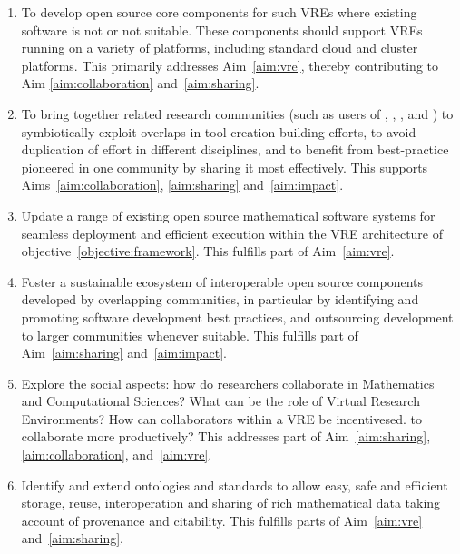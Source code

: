 \documentclass[noworkareas,deliverables,\classoptions]{euproposal}       %
\begin{document}
\begin{proposal}
\begin{enumerate}
\item\label{objectives:core} To develop open source core components
  for such VREs where existing software is not  or not suitable. These
  components should support VREs running on a variety of
  platforms, including standard cloud and cluster platforms. This primarily
  addresses Aim~\ref{aim:vre}, thereby contributing to Aim
  \ref{aim:collaboration} and~\ref{aim:sharing}.

\item \label{objective:community} To bring together related research
  communities (such as users of \Jupyter, \Sage, \Singular, and \GAP)
  to symbiotically exploit overlaps in tool creation building efforts,
  to avoid duplication of effort in different disciplines, and to
  benefit from best-practice pioneered in one community by sharing it
  most effectively. This supports Aims~\ref{aim:collaboration},
  \ref{aim:sharing} and~\ref{aim:impact}.

\item \label{objective:updates} Update a range of existing open source
  mathematical software systems for seamless deployment and efficient
  execution within the VRE architecture of objective~\ref{objective:framework}.
  This fulfills part of Aim~\ref{aim:vre}.



\item \label{objective:sustainable} Foster a sustainable ecosystem of
  interoperable open source components developed by overlapping
  communities, in particular by identifying and promoting software
  development best practices, and outsourcing development to larger
  communities whenever suitable. This fulfills part of
  Aim~\ref{aim:sharing} and~\ref{aim:impact}.

\item \label{objective:social} Explore the social aspects: how do
  researchers collaborate in Mathematics and Computational Sciences? What can be the role of
  Virtual Research Environments?  How can collaborators within a VRE be incentivesed.
  to collaborate more productively? This addresses part of
  Aim~\ref{aim:sharing}, \ref{aim:collaboration},  and~\ref{aim:vre}.

\item \label{objective:data} Identify and extend ontologies and
  standards to allow easy, safe and efficient storage, reuse,
  interoperation and sharing of rich mathematical data taking account
  of provenance and citability. This fulfills parts of
  Aim~\ref{aim:vre} and~\ref{aim:sharing}. 


\end{enumerate}
\end{proposal}
\end{document}
